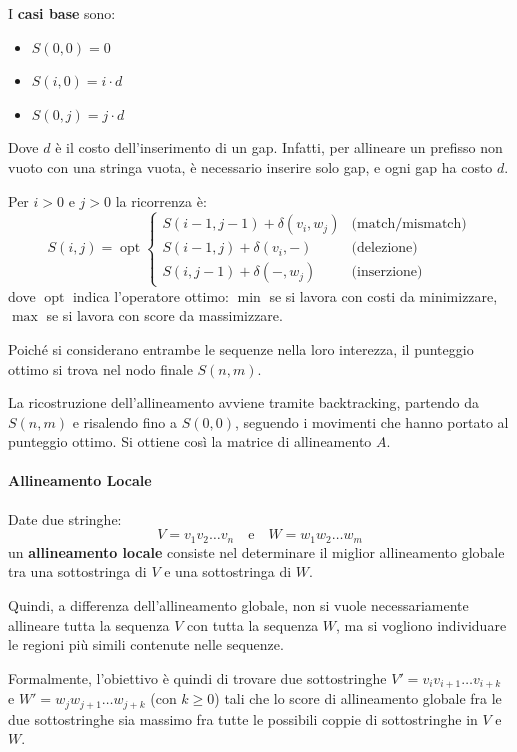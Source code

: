 I \textbf{casi base} sono:
\begin{itemize}
    \item $S(0,0)=0$
    \item $S(i,0)= i \cdot d$
    \item $S(0,j)= j \cdot d$
\end{itemize}

Dove $d$ è il costo dell'inserimento di un gap. Infatti, per allineare un prefisso non vuoto con una stringa vuota, è necessario inserire solo gap, e ogni gap ha costo $d$.

Per $i > 0$ e $j > 0$ la ricorrenza è:
\begin{equation}
    S(i,j) = \operatorname{opt}
    \begin{cases}
        S(i-1,j-1) + \delta(v_i,w_j) & \text{(match/mismatch)} \\
        S(i-1,j) + \delta(v_i,-) & \text{(delezione)} \\
        S(i,j-1) + \delta(-,w_j) & \text{(inserzione)}
    \end{cases}
\end{equation}
dove $\operatorname{opt}$ indica l'operatore ottimo: $\min$ se si lavora con costi da minimizzare, $\max$ se si lavora con score da massimizzare.

Poiché si considerano entrambe le sequenze nella loro interezza, il punteggio ottimo si trova nel nodo finale $S(n,m)$.

La ricostruzione dell'allineamento avviene tramite backtracking, partendo da $S(n,m)$ e risalendo fino a $S(0,0)$, seguendo i movimenti che hanno portato al punteggio ottimo.
Si ottiene così la matrice di allineamento $A$.

\paragraph{Allineamento Locale}

Date due stringhe:
\[
V = v_1 v_2 \ldots v_n \quad \text{e} \quad W = w_1 w_2 \ldots w_m
\]
un \textbf{allineamento locale} consiste nel determinare il miglior allineamento globale
tra una sottostringa di $V$ e una sottostringa di $W$.

Quindi, a differenza dell'allineamento globale, non si vuole necessariamente
allineare tutta la sequenza $V$ con tutta la sequenza $W$, ma si vogliono
individuare le regioni più simili contenute nelle sequenze.

Formalmente, l'obiettivo è quindi di trovare due sottostringhe $V' = v_i v_{i+1} \ldots v_{i+k}$ e $W' = w_j w_{j+1} \ldots w_{j+k}$ (con $k \geq 0$) tali che lo score di
allineamento globale fra le due sottostringhe sia massimo fra tutte le possibili coppie di sottostringhe in $V$ e $W$.

